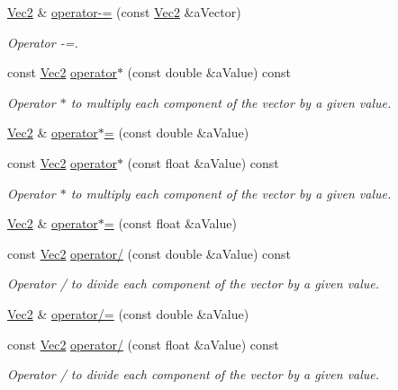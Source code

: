 \begin{DoxyCompactItemize}
\hyperlink{class_math_1_1_vec2}{Vec2} \& \hyperlink{class_math_1_1_vec2_a06529205b9f170c9a03f0a56b0c17b91}{operator-\/=} (const \hyperlink{class_math_1_1_vec2}{Vec2} \&aVector)
\begin{DoxyCompactList}\small\item\em Operator -\/=. \end{DoxyCompactList}\item 
const \hyperlink{class_math_1_1_vec2}{Vec2} \hyperlink{class_math_1_1_vec2_ab5ae36da60e186bb77247905ca800bdf}{operator$\ast$} (const double \&aValue) const 
\begin{DoxyCompactList}\small\item\em Operator $\ast$ to multiply each component of the vector by a given value. \end{DoxyCompactList}\item 
\hyperlink{class_math_1_1_vec2}{Vec2} \& \hyperlink{class_math_1_1_vec2_ac4f9a930354c9ee46b949942edfe01bf}{operator$\ast$=} (const double \&aValue)
\item 
const \hyperlink{class_math_1_1_vec2}{Vec2} \hyperlink{class_math_1_1_vec2_a0f413eb407c1bc2dd12733e4f225ecfb}{operator$\ast$} (const float \&aValue) const 
\begin{DoxyCompactList}\small\item\em Operator $\ast$ to multiply each component of the vector by a given value. \end{DoxyCompactList}\item 
\hyperlink{class_math_1_1_vec2}{Vec2} \& \hyperlink{class_math_1_1_vec2_a039f22e0586253749be6a702b4a29e8b}{operator$\ast$=} (const float \&aValue)
\item 
const \hyperlink{class_math_1_1_vec2}{Vec2} \hyperlink{class_math_1_1_vec2_a813f08d209c531ab037bdf670f0f707f}{operator/} (const double \&aValue) const 
\begin{DoxyCompactList}\small\item\em Operator / to divide each component of the vector by a given value. \end{DoxyCompactList}\item 
\hyperlink{class_math_1_1_vec2}{Vec2} \& \hyperlink{class_math_1_1_vec2_aa24ccc980574f24b6b7e1adc5a44a4f4}{operator/=} (const double \&aValue)
\item 
const \hyperlink{class_math_1_1_vec2}{Vec2} \hyperlink{class_math_1_1_vec2_adfcc0849b27c2d7a16a5c8967f69c9f7}{operator/} (const float \&aValue) const 
\begin{DoxyCompactList}\small\item\em Operator / to divide each component of the vector by a given value. \end{DoxyCompactList}\item 

\end{DoxyCompactItemize}
